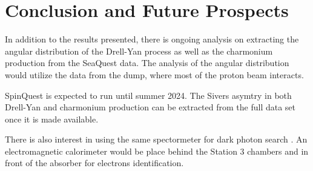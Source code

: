 \documentclass[../main.tex]{subfiles}
\begin{document}
\ifSubfilesClassLoaded{
	\mainmatter
	\setcounter{chapter}{5}
}{}

\chapter{Conclusion and Future Prospects}
\label{ch:conclusion}

In addition to the results presented, there is ongoing analysis on extracting 
the angular distribution of the Drell-Yan process as well as the charmonium 
production from the SeaQuest data. The analysis of the angular distribution would 
utilize the data from the dump, where most of the proton beam interacts.


SpinQuest is expected to run until summer 2024. The Sivers
asymtry in both Drell-Yan and charmonium production can be extracted from the full
data set once it is made available.

There is also interest in using the same spectormeter for dark photon search
\cite{apyan2022}. An electromagnetic calorimeter would be place behind the 
Station 3 chambers and in front of the absorber for electrons identification.

\ifSubfilesClassLoaded{ \printbibliography[heading=bibintoc,title={References}]}{}
\end{document}
